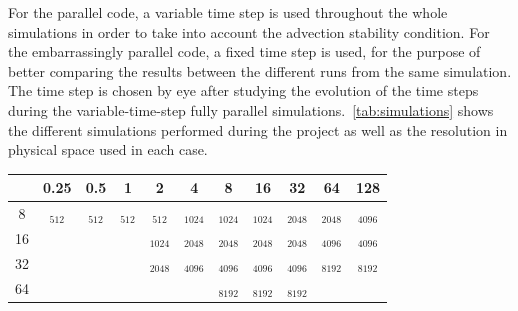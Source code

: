 \documentclass[../main.tex]{subfiles}
\begin{document}
For the parallel code, a variable time step is used throughout the whole simulations in order to take into account the advection stability condition. For the embarrassingly parallel code, a fixed time step is used, for the purpose of better comparing the results between the different runs from the same simulation. The time step is chosen by eye after studying the evolution of the time steps during the variable-time-step fully parallel simulations.~\cref{tab:simulations} shows the different simulations performed during the project as well as the resolution in physical space used in each case.
\begin{table}[ht]
	\centering
	\def\tickgreen{\textcolor{color_green3}{\ding{51}}}
	\def\tickblue{\textcolor{color_blue3}{\ding{51}}}
	\setlength{\tabcolsep}{5pt}
	\renewcommand{\arraystretch}{1.5}
	\begin{tabular}{c|cccccccccc}
		\diagbox[width=\dimexpr \textwidth/16+2\tabcolsep\relax, height=1cm]{$k_r$}{$\Re$} & 0.25               & 0.5                & 1                  & 2                           & 4                            & 8                            & 16                           & 32                           & 64                  & 128                 \\\hline
		8                                                                                  & \tickgreen$_{512}$ & \tickgreen$_{512}$ & \tickgreen$_{512}$ & \tickgreen\tickblue$_{512}$ & \tickgreen\tickblue$_{1024}$ & \tickgreen\tickblue$_{1024}$ & \tickgreen\tickblue$_{1024}$ & \tickgreen\tickblue$_{2048}$ & \tickgreen$_{2048}$ & \tickgreen$_{4096}$ \\
		16                                                                                 &                    &                    &                    & \tickblue$_{1024}$          & \tickblue$_{2048}$           & \tickgreen\tickblue$_{2048}$ & \tickgreen\tickblue$_{2048}$ & \tickgreen\tickblue$_{2048}$ & \tickgreen$_{4096}$ & \tickgreen$_{4096}$ \\
		32                                                                                 &                    &                    &                    & \tickblue$_{2048}$          & \tickblue$_{4096}$           & \tickgreen\tickblue$_{4096}$ & \tickgreen\tickblue$_{4096}$ & \tickgreen\tickblue$_{4096}$ & \tickgreen$_{8192}$ & \tickgreen$_{8192}$ \\
		64                                                                                 &                    &                    &                    &                             &                              & \tickgreen$_{8192}$          & \tickgreen$_{8192}$          & \tickgreen$_{8192}$          &                     &                     \\

\end{tabular}
\end{table}
\end{document}

